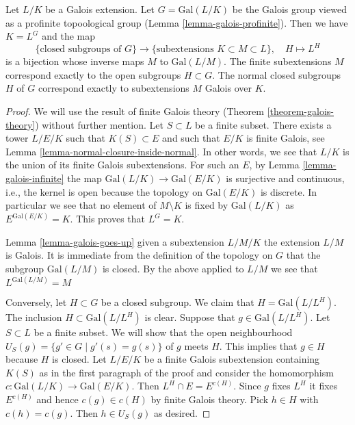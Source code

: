 \begin{theorem}
\label{theorem-inifinite-galois-theory}
Let $L/K$ be a Galois extension. Let $G = \text{Gal}(L/K)$
be the Galois group viewed as a profinite topoological group
(Lemma \ref{lemma-galois-profinite}). Then we have $K = L^G$ and the map
$$
\{\text{closed subgroups of }G\}
\longrightarrow
\{\text{subextensions }K \subset M \subset L\},\quad
H \longmapsto L^H
$$
is a bijection whose inverse maps $M$ to $\text{Gal}(L/M)$.
The finite subextensions $M$ correspond exactly to the open
subgroups $H \subset G$. The normal closed subgroups $H$ of $G$
correspond exactly to subextensions $M$ Galois over $K$.
\end{theorem}

\begin{proof}
We will use the result of finite Galois theory
(Theorem \ref{theorem-galois-theory})
without further mention.
Let $S \subset L$ be a finite subset. There exists a tower
$L/E/K$ such that $K(S) \subset E$ and such that
$E/K$ is finite Galois, see Lemma \ref{lemma-normal-closure-inside-normal}.
In other words, we see that $L/K$ is the union of its finite
Galois subextensions.
For such an $E$, by Lemma \ref{lemma-galois-infinite}
the map $\text{Gal}(L/K) \to \text{Gal}(E/K)$ is surjective
and continuous, i.e., the kernel is open because the topology
on $\text{Gal}(E/K)$ is discrete.
In particular we see that no element of $M \setminus K$ is fixed by
$\text{Gal}(L/K)$ as $E^{\text{Gal}(E/K)} = K$.
This proves that $L^G = K$.

\medskip\noindent
Lemma \ref{lemma-galois-goes-up} given a subextension $L/M/K$
the extension $L/M$ is Galois. It is immediate from the definition
of the topology on $G$ that the subgroup $\text{Gal}(L/M)$ is closed.
By the above applied to $L/M$ we see that $L^{\text{Gal}(L/M)} = M$

\medskip\noindent
Conversely, let $H \subset G$ be a closed subgroup. We claim that
$H = \text{Gal}(L/L^H)$. The inclusion $H \subset \text{Gal}(L/L^H)$
is clear. Suppose that $g \in \text{Gal}(L/L^H)$. Let $S \subset L$
be a finite subset. We will show that the open neighbourhood
$U_S(g) = \{g' \in G \mid g'(s) = g(s)\}$ of $g$ meets $H$.
This implies that $g \in H$ because $H$ is closed.
Let $L/E/K$ be a finite Galois subextension containing $K(S)$
as in the first paragraph of the proof and consider the homomorphism
$c : \text{Gal}(L/K) \to \text{Gal}(E/K)$.
Then $L^H \cap E = E^{c(H)}$. Since $g$ fixes $L^H$ it fixes
$E^{c(H)}$ and hence $c(g) \in c(H)$ by finite Galois theory.
Pick $h \in H$ with $c(h) = c(g)$. Then $h \in U_S(g)$ as desired.


\end{proof}
